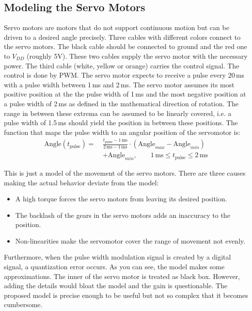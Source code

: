 \documentclass{sig-alternate-05-2015}
\begin{document}
\subsection{Modeling the Servo Motors}
Servo motors are motors that do not support continuous motion but can be driven to a desired angle precisely. Three cables with different colors connect to the servo motors. The black cable should be connected to ground and the red one to $V_{DD}$ (roughly 5V). These two cables supply the servo motor with the necessary power. The third cable (white, yellow or orange) carries the control signal. The control is done by PWM. The servo motor expects to receive a pulse every 20\,ms with a pulse width between 1\,ms and 2\,ms. The servo motor assumes its most positive position at the the pulse width of 1\,ms and the most negative position at a pulse width of 2\,ms as defined in the mathematical direction of rotation. The range in between these extrema can be assumed to be linearly covered, i.e. a pulse width of 1.5\,ms should yield the position in between these positions. The function that maps the pulse width to an angular position of the servomotor is:
\begin{align*}
	\text{Angle}(t_\text{pulse}) =~& \frac{t_\text{pulse} -1\,\text{ms} }{2\,\text{ms}-1\,\text{ms}}\cdot \left(\text{Angle}_{max}-\text{Angle}_{min}\right) \\ & + \text{Angle}_{min}, \qquad 1\,\text{ms} \le t_\text{pulse}\le 2\,\text{ms}
\end{align*}

This is just a model of the movement of the servo motors. There are three causes making the actual behavior deviate from the model:
\begin{itemize}
	\item A high torque forces the servo motors from leaving its desired position.
	\item The backlash of the gears in the servo motors adds an inaccuracy to the position.
	\item Non-linearities make the servomotor cover the range of movement not evenly.
\end{itemize}
Furthermore, when the pulse width modulation signal is created by a digital signal, a quantization error occurs.
As you can see, the model makes some approximations. The inner of the servo motor is treated as black box. However, adding the details would bloat the model and the gain is questionable. The proposed model is precise enough to be useful but not so complex that it becomes cumbersome.
\end{document}
